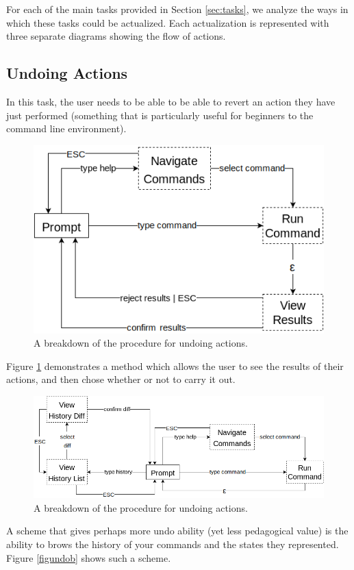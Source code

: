 For each of the main tasks provided in Section \ref{sec:tasks}, we analyze the
ways in which these tasks could be actualized. Each actualization is represented
with three separate diagrams showing the flow of actions.

\subsection{Undoing Actions}

In this task, the user needs to be able to be able to revert an action they have
just performed (something that is particularly useful for beginners to the
command line environment).
\begin{figure}[H]
  \centering
  \includegraphics[width=0.8\linewidth]{figures/alternatives/undo_a.png}
  \caption{A breakdown of the procedure for undoing actions.}
  \label{fig:undoa}
\end{figure}

Figure \ref{fig:undoa} demonstrates a method which allows the user to see the
results of their actions, and then chose whether or not to carry it out.

\begin{figure}[H]
  \centering
  \includegraphics[width=0.8\linewidth]{figures/alternatives/undo_b.png}
  \caption{A breakdown of the procedure for undoing actions.}
  \label{fig:undob}
\end{figure}

A scheme that gives perhaps more undo ability (yet less pedagogical value) is
the ability to brows the history of your commands and the states they
represented. Figure \ref{figundob} shows such a scheme.

